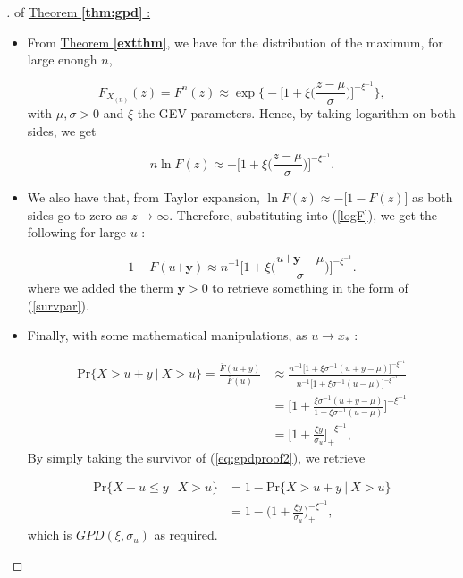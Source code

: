 \begin{proof}[\nopunct ] of \hyperref[extthm]{Theorem \textbf{\ref{thm:gpd}} :} 
\ \ \ \begin{itemize}
	 \item From \hyperref[extthm]{Theorem \textbf{\ref{extthm}}}, we have for the distribution of the maximum, for large enough $n$,  
	
	\begin{equation}
	F_{X_{(n)}}(z)=F^n(z)\approx \exp\Bigg\{ -\bigg[1+\xi\bigg(\frac{z-\mu}{\sigma}\bigg)\bigg]^{-\xi^{-1}}\Bigg\},
	\end{equation} 
	with $\mu,\sigma>0$ and $\xi$ the GEV parameters. Hence, by taking logarithm on both sides, we get
	
	\begin{equation} \label{logF}
	n \ln F(z)\approx -\Bigg[1+\xi\bigg(\frac{z-\mu}{\sigma}\bigg)\Bigg]^{-\xi^{-1}}.
	\end{equation}
		\item We also have that, from Taylor expansion,
		$\ln F(z)\approx -\big[1-F(z)\big]$
		as both sides go to zero as $z\rightarrow\infty$. Therefore, substituting into (\ref{logF}), we get the following for large $u$ :
		
		\begin{equation*}
		1-F(u\boldsymbol{+y})\approx n^{-1}\bigg[1+\xi\bigg(\frac{u\boldsymbol{+y}-\mu}{\sigma}\bigg)\bigg]^{-\xi^{-1}}.
		\end{equation*}
		where we added the therm $\boldsymbol{y}>0$ to retrieve something in the form of 
		(\ref{survpar}). 
		
		\item Finally, with some mathematical manipulations, as 
		$u\rightarrow x_*$ :
		
		
		\begin{equation}\label{eq:gpdproof2}
		\begin{aligned}
		\text{Pr}\{X>u+y\ | \ X>u\}
		= \frac{\bar{F}(u+y)}{\bar{F}(u)} 
		& \approx\frac{n^{-1}\big[1+\xi\sigma^{-1}(u+y-\mu)\big]^{-\xi^{-1}}}{n^{-1}\big[1+\xi\sigma^{-1}(u-\mu)\big]^{-\xi^{-1}}} \\  
		& = \bigg[1+\frac{\xi\sigma^{-1}(u+y-\mu)}{1+\xi\sigma^{-1}(u-\mu)}\bigg]^{-\xi^{-1}} \\
		& = \bigg[1+\frac{\xi y}{\sigma_u}\bigg]_+^{-\xi^{-1}},
		\end{aligned}
		\end{equation}
        By simply taking the survivor of (\ref{eq:gpdproof2}), we retrieve 
		
		\begin{equation}
		\begin{aligned}
		\text{Pr}\{X-u\leq y\ | \ X>u\} & =1-\text{Pr}\{X>u+y\ | \ X>u\} \\
		& = 1-\bigg(1+\frac{\xi y}{\sigma_u}\bigg)_+^{-\xi^{-1}},
		\end{aligned}
		\end{equation}
		which is $GPD(\xi,\sigma_u)$ as required.
	\end{itemize}
\end{proof}
